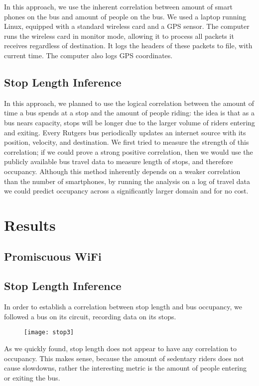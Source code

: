 \documentclass[letterpaper,english]{scrartcl}
\begin{document}
In this approach, we use the inherent correlation between amount of smart phones on the bus and amount of people on the bus.
We used a laptop running Linux, equipped with a standard wireless card and a GPS sensor.
The computer runs the wireless card in monitor mode, allowing it to process all packets it receives regardless of destination. It logs the headers of these packets to file, with current time.
The computer also logs GPS coordinates.

\subsection*{Stop Length Inference}

In this approach, we planned to use the logical correlation between the amount of time a bus spends at a stop and the amount of people riding: the idea is that as a bus nears capacity, stops will be longer due to the larger volume of riders entering and exiting.
Every Rutgers bus periodically updates an internet source with its position, velocity, and destination.
We first tried to measure the strength of this correlation; if we could prove a strong positive correlation, then we would use the publicly available bus travel data to measure length of stops, and therefore occupancy.
Although this method inherently depends on a weaker correlation than the number of smartphones, by running the analysis on a log of travel data we could predict occupancy across a significantly larger domain and for no cost.

\section*{Results}

\subsection*{Promiscuous WiFi}

\subsection*{Stop Length Inference}
In order to establish a correlation between stop length and bus occupancy, we followed a bus on its circuit, recording data on its stops.
\begin{figure}[H]
\texttt{[image: stop3]}
\centering
\end{figure}
As we quickly found, stop length does not appear to have any correlation to occupancy.
This makes sense, because the amount of sedentary riders does not cause slowdowns, rather the interesting metric is the amount of people entering or exiting the bus.
\end{document}
